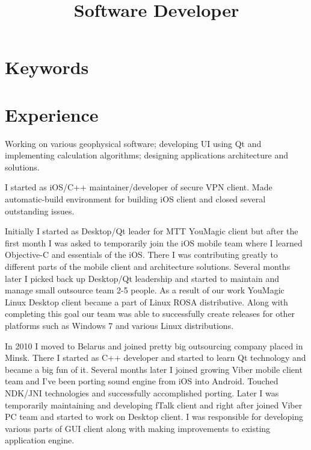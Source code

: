\documentclass[11pt, a4paper]{moderncv}
\title{Software Developer}
\begin{document}
 
\maketitle

\section{Keywords}

\section{Experience}

{
Working on various geophysical software; 
developing UI using Qt and implementing calculation algorithms; 
designing applications architecture and solutions.
}

{
I started as iOS/C++ maintainer/developer of secure VPN client.
Made automatic-build environment for building iOS client and closed several outstanding issues.
}

{
Initially I started as Desktop/Qt leader for MTT YouMagic client but after the first month I was asked to temporarily join the iOS mobile team where  
I learned Objective-C and essentials of the iOS. There I was contributing greatly to different parts of the mobile client and architecture solutions.
Several months later I picked back up Desktop/Qt leadership and started to maintain and manage small outsource team 2-5 people. 
As a result of our work YouMagic Linux Desktop client became a part of Linux ROSA distributive.
Along with completing this goal our team was able to successfully create releases for other platforms such as Windows 7 and various Linux distributions.
}

{
In 2010 I moved to Belarus and joined pretty big outsourcing company placed in Minsk. 
There I started as C++ developer and started to learn Qt technology and became a big fun of it.
Several months later I joined growing Viber mobile client team and I've been porting sound engine from iOS into Android. 
Touched NDK/JNI technologies and successfully accomplished porting.
Later I was temporarily maintaining and developing fTalk client and right after joined Viber PC team and started to work on Desktop client.
I was responsible for developing various parts of GUI client along with making improvements to existing application engine.
}
\end{document}
